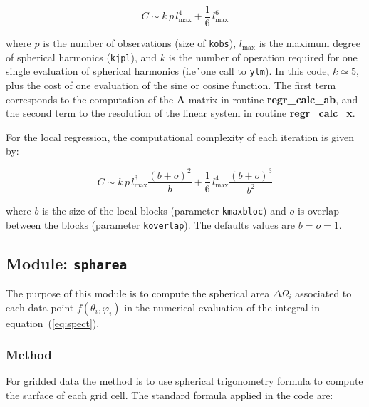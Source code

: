 \documentclass[11pt]{article}
\begin{document}
\begin{equation}
C \sim k \, p  \, l_{\max}^4 + \frac{1}{6} \, l_{\max}^6
\end{equation}

\noindent
where $p$ is the number of observations (size of {\tt kobs}),
$l_{\max}$ is the maximum degree of spherical harmonics ({\tt kjpl}), and
$k$ is the number of operation required for one single evaluation
of spherical harmonics (i.e\. one call to {\tt ylm}).
In this code, $k\simeq 5$, plus the cost of one evaluation of the sine or cosine function.
The first term corresponds to the computation of the {\bf A} matrix
in routine {\bf regr\_calc\_ab}, and the second term to the resolution
of the linear system in routine {\bf regr\_calc\_x}.

For the local regression, the computational complexity of each iteration is given by:

\begin{equation}
C \sim k \, p  \, l_{\max}^3  \frac{(b+o)^2}{b}
       + \frac{1}{6} \, l_{\max}^4 \frac{(b+o)^3}{b^2}
\end{equation}

\noindent
where $b$ is the size of the local blocks (parameter {\tt kmaxbloc})
and $o$ is overlap between the blocks (parameter {\tt koverlap}).
The defaults values are $b=o=1$.

\subsection{Module: {\tt spharea}}

The purpose of this module is to compute the spherical area
$\Delta\Omega_i$ associated to each data point $f(\theta_i,\varphi_i)$
in the numerical evaluation of the integral in equation~(\ref{eq:spect}).

\subsubsection*{Method}

For gridded data the method is to use spherical trigonometry formula
to compute the surface of each grid cell. The standard formula
applied in the code are:
\end{document}
